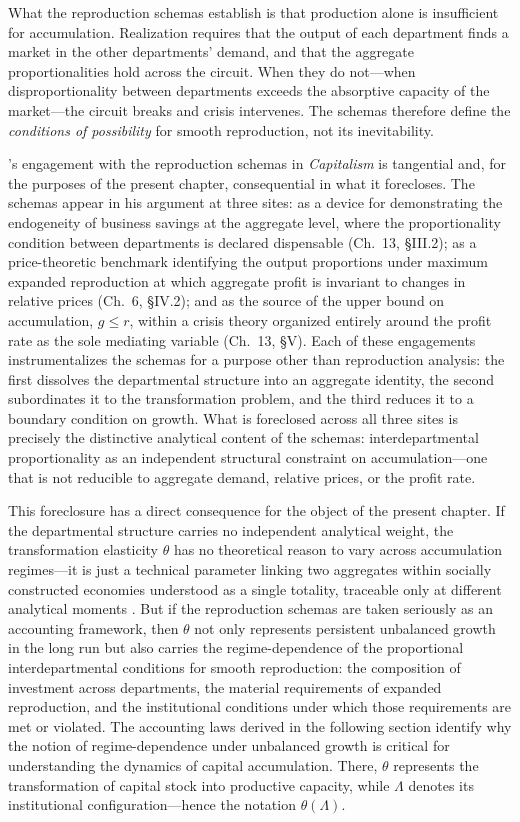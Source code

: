What the reproduction schemas establish is that production alone is insufficient for accumulation. Realization requires that the output of each department finds a market in the other departments' demand, and that the aggregate proportionalities hold across the circuit. When they do not---when disproportionality between departments exceeds the absorptive capacity of the market---the circuit breaks and crisis intervenes. The schemas therefore define the \textit{conditions of possibility} for smooth reproduction, not its inevitability.

\citet{Shaikh2016}'s engagement with the reproduction schemas in \emph{Capitalism} is tangential and, for the purposes of the present chapter, consequential in what it forecloses. The schemas appear in his argument at three sites: as a device for demonstrating the endogeneity of business savings at the aggregate level, where the proportionality condition between departments is declared dispensable (Ch.~13, \S III.2); as a price-theoretic benchmark identifying the output proportions under maximum expanded reproduction at which aggregate profit is invariant to changes in relative prices (Ch.~6, \S IV.2); and as the source of the upper bound on accumulation, $g \leq r$, within a crisis theory organized entirely around the profit rate as the sole mediating variable (Ch.~13, \S V). Each of these engagements instrumentalizes the schemas for a purpose other than reproduction analysis: the first dissolves the departmental structure into an aggregate identity, the second subordinates it to the transformation problem, and the third reduces it to a boundary condition on growth. What is foreclosed across all three sites is precisely the distinctive analytical content of the schemas: interdepartmental proportionality as an independent structural constraint on accumulation---one that is not reducible to aggregate demand, relative prices, or the profit rate.

This foreclosure has a direct consequence for the object of the present chapter. If the departmental structure carries no independent analytical weight, the transformation elasticity $\theta$ has no theoretical reason to vary across accumulation regimes---it is just a technical parameter linking two aggregates within socially constructed economies understood as a single totality, traceable only at different analytical moments \citep{Vidal2012}. But if the reproduction schemas are taken seriously as an accounting framework, then $\theta$ not only represents persistent unbalanced growth in the long run but also carries the regime-dependence of the proportional interdepartmental conditions for smooth reproduction: the composition of investment across departments, the material requirements of expanded reproduction, and the institutional conditions under which those requirements are met or violated. The accounting laws derived in the following section identify why the notion of regime-dependence under unbalanced growth is critical for understanding the dynamics of capital accumulation. There, $\theta$ represents the transformation of capital stock into productive capacity, while $\Lambda$ denotes its institutional configuration---hence the notation $\theta(\Lambda)$.

